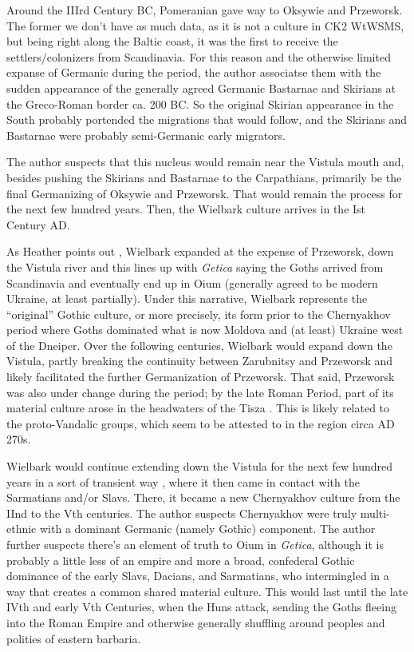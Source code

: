 \documentclass{article}
\begin{document}
	Around the IIIrd Century BC, Pomeranian gave way to Oksywie and Przeworsk.
	The former we don’t have as much data, as it is not a culture in CK2 WtWSMS, but being right along the Baltic coast, it was the first to receive the settlers/colonizers from Scandinavia.
	For this reason and the otherwise limited expanse of Germanic during the period, the author associatse them with the sudden appearance of the generally agreed Germanic Bastarnae and Skirians at the Greco-Roman border ca. 200 BC.
	So the original Skirian appearance in the South probably portended the migrations that would follow, and the Skirians and Bastarnae were probably semi-Germanic early migrators.
	
	The author suspects that this nucleus would remain near the Vistula mouth and, besides pushing the Skirians and Bastarnae to the Carpathians, primarily be the final Germanizing of Oksywie and Przeworsk.
	That would remain the process for the next few hundred years.
	Then, the Wielbark culture arrives in the Ist Century AD.
	
	As Heather points out \cite{HeatherEmpiresAndBarbarians}, Wielbark expanded at the expense of Przeworsk, down the Vistula river and this lines up with \textit{Getica} saying the Goths arrived from Scandinavia and eventually end up in Oium (generally agreed to be modern Ukraine, at least partially).
	Under this narrative, Wielbark represents the “original” Gothic culture, or more precisely, its form prior to the Chernyakhov period where Goths dominated what is now Moldova and (at least) Ukraine west of the Dneiper.
	Over the following centuries, Wielbark would expand down the Vistula, partly breaking the continuity between Zarubnitsy and Przeworsk and likely facilitated the further Germanization of Przeworsk. 
	That said, Przeworsk was also under change during the period; by the late Roman Period, part of its material culture arose in the headwaters of the Tisza \cite{PrzeworskHistory}. This is likely related to the proto-Vandalic groups, which seem to be attested to in the region circa AD 270s.
	
	Wielbark would continue extending down the Vistula for the next few hundred years in a sort of transient way \cite{HeatherEmpiresAndBarbarians}, where it then came in contact with the Sarmatians and/or Slavs.
	There, it became a new Chernyakhov culture from the IInd to the Vth centuries.
	The author suspects Chernyakhov were truly multi-ethnic with a dominant Germanic (namely Gothic) component.
	The author further suspects there’s an element of truth to Oium in \textit{Getica}, although it is probably a little less of an empire and more a broad, confederal Gothic dominance of the early Slavs, Dacians, and Sarmatians, who intermingled in a way that creates a common shared material culture.
	This would last until the late IVth and early Vth Centuries, when the Huns attack, sending the Goths fleeing into the Roman Empire and otherwise generally shuffling around peoples and polities of eastern barbaria. 
	
\end{document}

